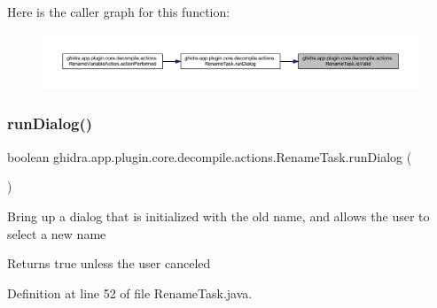 Here is the caller graph for this function\+:
\nopagebreak
\begin{figure}[H]
\begin{center}
\leavevmode
\includegraphics[width=350pt]{classghidra_1_1app_1_1plugin_1_1core_1_1decompile_1_1actions_1_1_rename_task_aaf101a54f5b25d5e37996bc7008abfc5_icgraph}
\end{center}
\end{figure}
\mbox{\label{classghidra_1_1app_1_1plugin_1_1core_1_1decompile_1_1actions_1_1_rename_task_a871de7fef6150006478b2b3a8f56ec15}} 
\subsubsection{\texorpdfstring{runDialog()}{runDialog()}}
{\footnotesize\ttfamily boolean ghidra.\+app.\+plugin.\+core.\+decompile.\+actions.\+Rename\+Task.\+run\+Dialog (\begin{DoxyParamCaption}{ }\end{DoxyParamCaption})\hspace{0.3cm}{\ttfamily [inline]}}

Bring up a dialog that is initialized with the old name, and allows the user to select a new name \begin{DoxyReturn}{Returns}
true unless the user canceled 
\end{DoxyReturn}


Definition at line 52 of file Rename\+Task.\+java.


